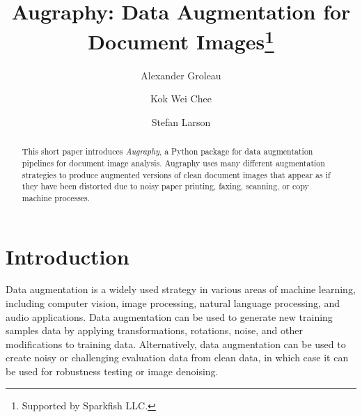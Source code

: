 \documentclass[runningheads]{llncs}
\begin{document}
%
\title{Augraphy: Data Augmentation for \\Document Images\thanks{Supported by Sparkfish LLC.}}
\author{Alexander Groleau \and
Kok Wei Chee \and
Stefan Larson}
%
%
\maketitle
%
\begin{abstract}
This short paper introduces \emph{Augraphy}, a Python package for data augmentation pipelines for document image analysis.
Augraphy uses many different augmentation strategies to produce augmented versions of clean document images that appear as if they have been distorted due to noisy paper printing, faxing, scanning, or copy machine processes.

\end{abstract}
%
%
%
\section{Introduction}
Data augmentation is a widely used strategy in various areas of machine learning, including computer vision, image processing, natural language processing, and audio applications. Data augmentation can be used to generate new training samples data by applying transformations, rotations, noise, and other modifications to training data.
Alternatively, data augmentation can be used to create noisy or challenging evaluation data from clean data, in which case it can be used for robustness testing or image denoising.\\
\end{document}
